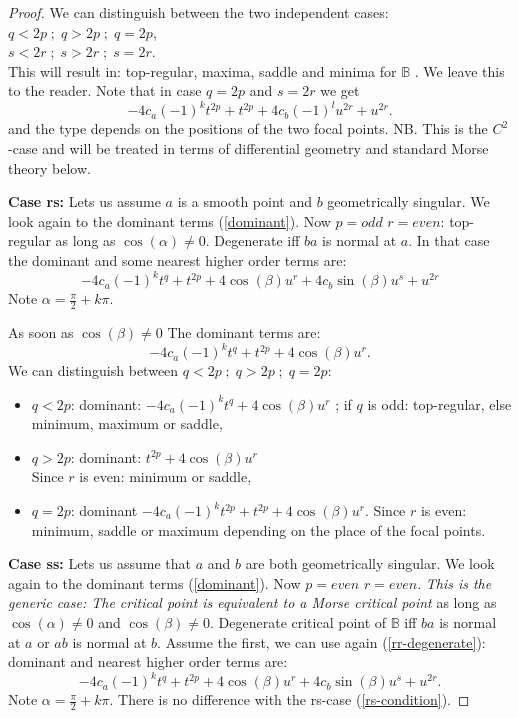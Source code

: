 \documentclass[12pt,a4,twoside]{amsart}
\newtheorem*{main lemma}{The main lemma}
\begin{document}
\begin{proof}
We can distinguish between  the two independent cases:\\
$q < 2p \; ; \; q > 2p \; ; \; q = 2p$,\\
$s < 2r \; ; \; s > 2r \; ; \; s = 2r$.\\
This will result in: top-regular, maxima, saddle and minima for $\mathbb{B}$ . We leave this to the reader.
Note that in case $q=2p$ and $s=2r$ we get
\begin{equation}\label{rr-degenerate}
  -4 c_a (-1)^k t^{2p} +t^{2 p} +4 c_b (-1)^l u^{2r}+u^{2 r}.
\end{equation}
and the type depends on the positions of the two focal points. 
NB. This is the $C^2$-case and will be treated in terms of differential geometry and standard Morse theory below.

{\bf Case rs: } Lets us assume $a$ is a  smooth point and $b$ geometrically singular. We look again to the dominant terms (\ref{dominant}). Now $p = odd$ $r= even$: top-regular as long as $\cos(\alpha) \ne 0$.  Degenerate iff $ba$ is normal at $a$. In that case
the dominant and some nearest higher order terms are:
\begin{equation}\label{rs-condition}
  -4 c_a (-1)^k t^q +t^{2 p} +4 \cos (\beta ) u^r   +4 c_b \sin (\beta ) u^s+u^{2 r}
\end{equation}
Note $  \alpha = \frac{\pi}{2} + k \pi.$ 

As soon as $\cos (\beta) \ne 0$ The dominant terms are:
$$  -4 c_a (-1)^k t^q +t^{2 p} +4 \cos (\beta ) u^r.  $$
We can distinguish between
$q < 2p \; ; \; q > 2p \; ; \; q = 2p$:
\begin{itemize}
\item $q < 2p$: dominant: $-4 c_a (-1)^k  t^q +4  \cos(\beta ) u^r$ ; if $q$ is odd: top-regular, else minimum, maximum or saddle,
\item $q > 2p$: dominant: $ t^{2 p} +4 \cos (\beta ) u^r  $ \\
Since $r$ is even: minimum or saddle,
\item $q =2p$: dominant $  -4 c_a (-1)^k t^{2p} +t^{2 p} +4 \cos (\beta ) u^r  $.
 Since $r$ is  even: minimum, saddle or maximum depending on the  place of the focal points.
\end{itemize}




{\bf Case ss:}   
 Lets us assume that  $a$  and $b$ are both geometrically singular. We look again to the dominant terms (\ref{dominant}). Now $p = even$ $r=even$. \textit{This is the generic case: The critical point is equivalent to a Morse critical point} as long as $\cos(\alpha) \ne 0$  and  $\cos(\beta) \ne 0$. Degenerate critical point of $\mathbb{B}$ iff $ba$ is normal at $a$ or $ab$ is normal at $b$. Assume the first, we can use again (\ref{rr-degenerate}):
dominant and nearest higher order terms are:
\begin{equation}
  -4 c_a (-1)^k t^q +t^{2 p} +4 \cos (\beta ) u^r +4 c_b \sin (\beta ) u^s+u^{2 r}.
\end{equation}
Note $  \alpha = \frac{\pi}{2} + k \pi.$ 
There is no difference with the  rs-case (\ref{rs-condition}).



\end{proof}
\end{document}
